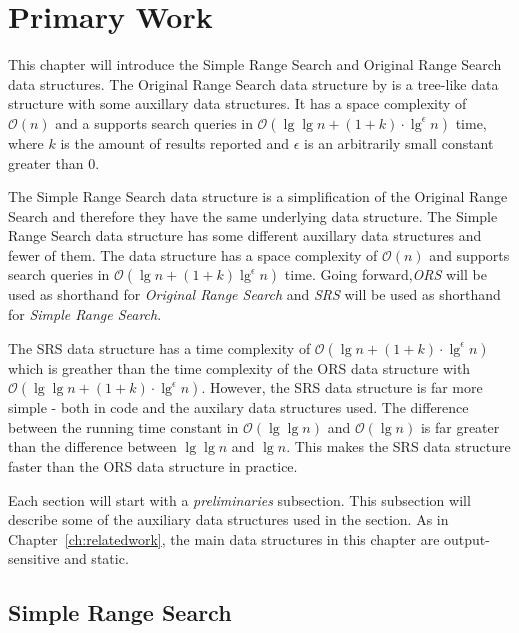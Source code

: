 \chapter{Primary Work}
\label{ch:primarywork}


This chapter will introduce the Simple Range Search and Original Range Search data structures. The Original Range Search data structure by \citet{chanetal} is a tree-like data structure with some auxillary data structures. It has a space complexity of $\mathcal{O}(n)$ and a supports search queries in $\mathcal{O}(\lg\lg n + (1+k)\cdot\lg^\epsilon n)$ time, where $k$ is the amount of results reported and $\epsilon$ is an arbitrarily small constant greater than $0$.

The Simple Range Search data structure is a simplification of the Original Range Search and therefore they have the same underlying data structure. The Simple Range Search data structure has some different auxillary data structures and fewer of them. The data structure has a space complexity of $\mathcal{O}(n)$ and supports search queries in $\mathcal{O}(\lg n + (1+k)\lg^\epsilon n)$ time. Going forward,\emph{ORS} will be used as shorthand for \emph{Original Range Search} and \emph{SRS} will be used as shorthand for \emph{Simple Range Search}.


The SRS data structure has a time complexity of $\mathcal{O}(\lg n + (1+k)\cdot \lg^\epsilon n)$ which is greather than the time complexity of the ORS data structure with $\mathcal{O}(\lg \lg n + (1+k)\cdot \lg^\epsilon n)$. However, the SRS data structure is far more simple - both in code and the auxilary data structures used. The difference between the running time constant in $\mathcal{O}(\lg \lg n)$ and $\mathcal{O}(\lg n)$ is far greater than the difference between $\lg \lg n$ and $\lg n$. This makes the SRS data structure faster than the ORS data structure in practice.

\vspace{4mm}

Each section will start with a \emph{preliminaries} subsection. This subsection will describe some of the auxiliary data structures used in the section. As in Chapter~\ref{ch:relatedwork}, the main data structures in this chapter are output-sensitive and static.

\section{Simple Range Search}
\label{sect:simple}


